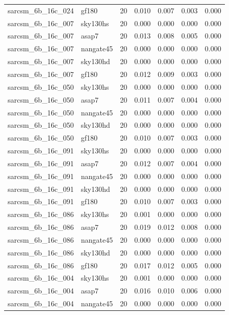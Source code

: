 \begin{tabular}{llrrrrr}
sarcsm\_6b\_16c\_024 & gf180 & 20 & 0.010 & 0.007 & 0.003 & 0.000 \\
sarcsm\_6b\_16c\_007 & sky130hs & 20 & 0.000 & 0.000 & 0.000 & 0.000 \\
sarcsm\_6b\_16c\_007 & asap7 & 20 & 0.013 & 0.008 & 0.005 & 0.000 \\
sarcsm\_6b\_16c\_007 & nangate45 & 20 & 0.000 & 0.000 & 0.000 & 0.000 \\
sarcsm\_6b\_16c\_007 & sky130hd & 20 & 0.000 & 0.000 & 0.000 & 0.000 \\
sarcsm\_6b\_16c\_007 & gf180 & 20 & 0.012 & 0.009 & 0.003 & 0.000 \\
sarcsm\_6b\_16c\_050 & sky130hs & 20 & 0.000 & 0.000 & 0.000 & 0.000 \\
sarcsm\_6b\_16c\_050 & asap7 & 20 & 0.011 & 0.007 & 0.004 & 0.000 \\
sarcsm\_6b\_16c\_050 & nangate45 & 20 & 0.000 & 0.000 & 0.000 & 0.000 \\
sarcsm\_6b\_16c\_050 & sky130hd & 20 & 0.000 & 0.000 & 0.000 & 0.000 \\
sarcsm\_6b\_16c\_050 & gf180 & 20 & 0.010 & 0.007 & 0.003 & 0.000 \\
sarcsm\_6b\_16c\_091 & sky130hs & 20 & 0.000 & 0.000 & 0.000 & 0.000 \\
sarcsm\_6b\_16c\_091 & asap7 & 20 & 0.012 & 0.007 & 0.004 & 0.000 \\
sarcsm\_6b\_16c\_091 & nangate45 & 20 & 0.000 & 0.000 & 0.000 & 0.000 \\
sarcsm\_6b\_16c\_091 & sky130hd & 20 & 0.000 & 0.000 & 0.000 & 0.000 \\
sarcsm\_6b\_16c\_091 & gf180 & 20 & 0.010 & 0.007 & 0.003 & 0.000 \\
sarcsm\_6b\_16c\_086 & sky130hs & 20 & 0.001 & 0.000 & 0.000 & 0.000 \\
sarcsm\_6b\_16c\_086 & asap7 & 20 & 0.019 & 0.012 & 0.008 & 0.000 \\
sarcsm\_6b\_16c\_086 & nangate45 & 20 & 0.000 & 0.000 & 0.000 & 0.000 \\
sarcsm\_6b\_16c\_086 & sky130hd & 20 & 0.000 & 0.000 & 0.000 & 0.000 \\
sarcsm\_6b\_16c\_086 & gf180 & 20 & 0.017 & 0.012 & 0.005 & 0.000 \\
sarcsm\_6b\_16c\_004 & sky130hs & 20 & 0.001 & 0.000 & 0.000 & 0.000 \\
sarcsm\_6b\_16c\_004 & asap7 & 20 & 0.016 & 0.010 & 0.006 & 0.000 \\
sarcsm\_6b\_16c\_004 & nangate45 & 20 & 0.000 & 0.000 & 0.000 & 0.000 \\

\end{tabular}
